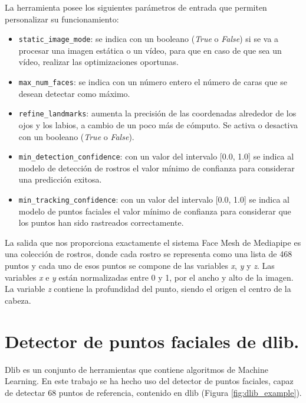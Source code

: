 La herramienta posee los siguientes parámetros de entrada que permiten personalizar su funcionamiento:
\begin{itemize}
    \item \verb|static_image_mode|: se indica con un booleano (\textit{True} o \textit{False}) si se va a procesar una imagen estática o un vídeo, para que en caso de que sea un vídeo, realizar las optimizaciones oportunas.
    
    \item \verb|max_num_faces|: se indica con un número entero el número de caras que se desean detectar como máximo.
    
    \item \verb|refine_landmarks|: aumenta la precisión de las coordenadas alrededor de los ojos y los labios, a cambio de un poco más de cómputo. Se activa o desactiva con un booleano (\textit{True} o \textit{False}).
    
    \item \verb|min_detection_confidence|: con un valor del intervalo [0.0, 1.0] se indica al modelo de detección de rostros el valor mínimo de confianza para considerar una predicción exitosa.
    
    \item \verb|min_tracking_confidence|: con un valor del intervalo [0.0, 1.0] se indica al modelo de puntos faciales el valor mínimo de confianza para considerar que los puntos han sido rastreados correctamente.
\end{itemize}

La salida que nos proporciona exactamente el sistema Face Mesh de Mediapipe es una colección de rostros, donde cada rostro se representa como una lista de 468 puntos y cada uno de esos puntos se compone de las variables \textit{x}, \textit{y} y \textit{z}. Las variables \textit{x} e \textit{y} están normalizadas entre 0 y 1, por el ancho y alto de la imagen. La variable \textit{z} contiene la profundidad del punto, siendo el origen el centro de la cabeza.

\section{Detector de puntos faciales de dlib.}
\label{sec:dlib}

Dlib es un conjunto de herramientas que contiene algoritmos de Machine Learning. En este trabajo se ha hecho uso del detector de puntos faciales, capaz de detectar 68 puntos de referencia, contenido en dlib (Figura \ref{fig:dlib_example}).\\

